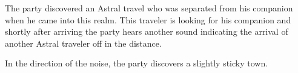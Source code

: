 The party discovered an Astral travel who was separated from his companion when he came into this realm.
This traveler is looking for his companion and shortly after arriving the party hears another sound indicating the arrival of another Astral traveler off in the distance.

In the direction of the noise, the party discovers a slightly sticky town.
